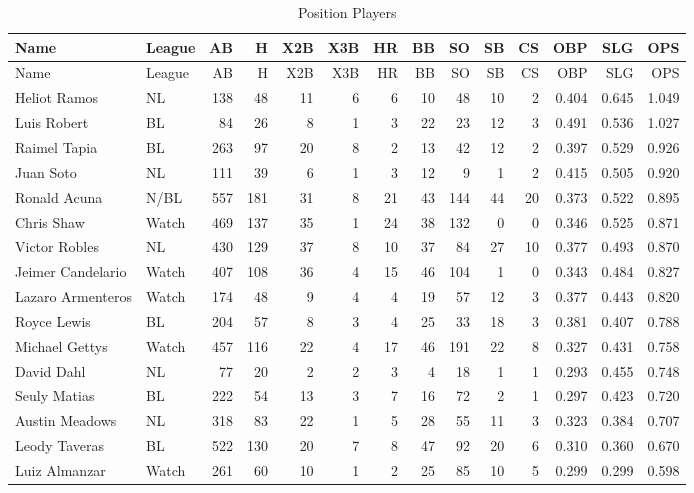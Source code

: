 \documentclass[]{article}
\begin{document}
\begin{longtable}[]{@{}llrrrrrrrrrrrr@{}}
\caption{Position Players}\tabularnewline
\toprule
Name & League & AB & H & X2B & X3B & HR & BB & SO & SB & CS & OBP & SLG
& OPS\tabularnewline
\midrule
\endfirsthead
\toprule
Name & League & AB & H & X2B & X3B & HR & BB & SO & SB & CS & OBP & SLG
& OPS\tabularnewline
\midrule
\endhead
Heliot Ramos & NL & 138 & 48 & 11 & 6 & 6 & 10 & 48 & 10 & 2 & 0.404 &
0.645 & 1.049\tabularnewline
Luis Robert & BL & 84 & 26 & 8 & 1 & 3 & 22 & 23 & 12 & 3 & 0.491 &
0.536 & 1.027\tabularnewline
Raimel Tapia & BL & 263 & 97 & 20 & 8 & 2 & 13 & 42 & 12 & 2 & 0.397 &
0.529 & 0.926\tabularnewline
Juan Soto & NL & 111 & 39 & 6 & 1 & 3 & 12 & 9 & 1 & 2 & 0.415 & 0.505 &
0.920\tabularnewline
Ronald Acuna & N/BL & 557 & 181 & 31 & 8 & 21 & 43 & 144 & 44 & 20 &
0.373 & 0.522 & 0.895\tabularnewline
Chris Shaw & Watch & 469 & 137 & 35 & 1 & 24 & 38 & 132 & 0 & 0 & 0.346
& 0.525 & 0.871\tabularnewline
Victor Robles & NL & 430 & 129 & 37 & 8 & 10 & 37 & 84 & 27 & 10 & 0.377
& 0.493 & 0.870\tabularnewline
Jeimer Candelario & Watch & 407 & 108 & 36 & 4 & 15 & 46 & 104 & 1 & 0 &
0.343 & 0.484 & 0.827\tabularnewline
Lazaro Armenteros & Watch & 174 & 48 & 9 & 4 & 4 & 19 & 57 & 12 & 3 &
0.377 & 0.443 & 0.820\tabularnewline
Royce Lewis & BL & 204 & 57 & 8 & 3 & 4 & 25 & 33 & 18 & 3 & 0.381 &
0.407 & 0.788\tabularnewline
Michael Gettys & Watch & 457 & 116 & 22 & 4 & 17 & 46 & 191 & 22 & 8 &
0.327 & 0.431 & 0.758\tabularnewline
David Dahl & NL & 77 & 20 & 2 & 2 & 3 & 4 & 18 & 1 & 1 & 0.293 & 0.455 &
0.748\tabularnewline
Seuly Matias & BL & 222 & 54 & 13 & 3 & 7 & 16 & 72 & 2 & 1 & 0.297 &
0.423 & 0.720\tabularnewline
Austin Meadows & NL & 318 & 83 & 22 & 1 & 5 & 28 & 55 & 11 & 3 & 0.323 &
0.384 & 0.707\tabularnewline
Leody Taveras & BL & 522 & 130 & 20 & 7 & 8 & 47 & 92 & 20 & 6 & 0.310 &
0.360 & 0.670\tabularnewline
Luiz Almanzar & Watch & 261 & 60 & 10 & 1 & 2 & 25 & 85 & 10 & 5 & 0.299
& 0.299 & 0.598\tabularnewline
\bottomrule
\end{longtable}
\end{document}

